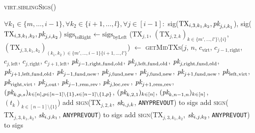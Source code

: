 \begin{center}
\begin{processbox}{\textsc{virt.siblingSigs}()}
\begin{algorithmic}[1]
      \Indent
        \State $\forall k_1 \in \{m, \dots, i-1\}, \forall k_2 \in \{i+1, \dots,
        l\}, \forall j \in [i-1]:$
        \Indent
          \State sig($\mathrm{TX}_{i, 3, k_1, k_2}, \textit{pk}_{j, i, k_1}$),
          sig($\mathrm{TX}_{i, 3, k_1, k_2}, \textit{pk}_{j, i, k_2}$)
        \EndIndent
      \EndIndent
      \State $\mathrm{sigs}_{\mathrm{toRight}} \gets
      \mathrm{sigs}_{\mathrm{byLeft}}$
      \Statex
        \State ($\mathrm{TX}_{j, 1}$, $(\mathrm{TX}_{j, 2, k})_{k \in \{m',
        \dots, l'\} \setminus \{i\}}$, $(\mathrm{TX}_{j, 3, k_1, k_2})_{(k_1,
        k_2) \in \{m', \dots, i-1\} \{i+1, \dots, l'\}}$) $\gets$
        \textsc{getMidTXs}($j$, $n$, $c_{\mathrm{virt}}$, $c_{j-1,
        \mathrm{right}}$, $c_{j, \mathrm{left}}$, $c_{j, \mathrm{right}}$,
        $c_{j+1, \mathrm{left}}$, $\textit{pk}_{j-1, \mathrm{right}, \mathrm{fund},
        \mathrm{old}}$, $\textit{pk}_{j, \mathrm{left}, \mathrm{fund}, \mathrm{old}}$,
        $\textit{pk}_{j, \mathrm{right}, \mathrm{fund}, \mathrm{old}}$, $\textit{pk}_{j+1,
        \mathrm{left}, \mathrm{fund}, \mathrm{old}}$, $\textit{pk}_{j-1, \mathrm{fund},
        \mathrm{new}}$, $\textit{pk}_{j, \mathrm{fund}, \mathrm{new}}$, $\textit{pk}_{j,
        \mathrm{fund}, \mathrm{new}}$, $\textit{pk}_{j+1, \mathrm{fund}, \mathrm{new}}$,
        $\textit{pk}_{\mathrm{left}, \mathrm{virt}}$, $\textit{pk}_{\mathrm{right},
        \mathrm{virt}}$, $\textit{pk}_{j, \mathrm{out}}$, $\textit{pk}_{j-1, \mathrm{rem},
        \mathrm{rev}}$, $\textit{pk}_{j, \mathrm{loc}, \mathrm{rev}}$, $\textit{pk}_{j+1,
        \mathrm{rem}, \mathrm{rev}}$, $(\textit{pk}_{k, p, s})_{k \in [n], p \in [n-1]
        \setminus \{1\}, s \in [n-1] \setminus \{1, p\}}$, $(\textit{pk}_{k, 2, 1})_{k
        \in [n]}$, $(\textit{pk}_{k, n-1, n})_{k \in [n]}$, $(t_k)_{k \in [n-1] \setminus
        \{1\}}$)
          \State add \textsc{sign}($\mathrm{TX}_{j, 2, k}$, $\textit{sk}_{i, j, k}$,
          \texttt{ANYPREVOUT}) to sigs
        \EndFor
          \State add \textsc{sign}($\mathrm{TX}_{j, 3, k_1, k_2}$, $\textit{sk}_{i, j,
          k_1}$, \texttt{ANYPREVOUT}) to sigs
          \State add \textsc{sign}($\mathrm{TX}_{j, 3, k_1, k_2}$, $\textit{sk}_{i, j,
          k_2}$, \texttt{ANYPREVOUT}) to sigs
        \EndFor
      \EndFor
       

\end{algorithmic}
\end{processbox}
\end{center}
